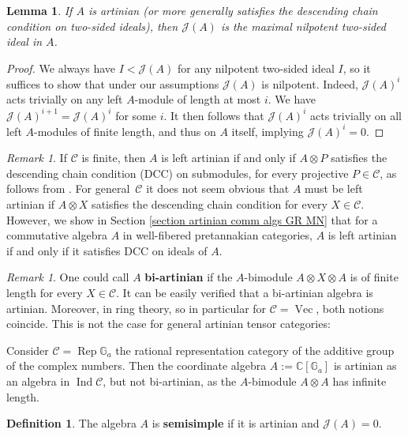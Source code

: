 \documentclass[11pt]{amsart}
\def\Ind{\operatorname{Ind}}
\def\JJ{\mathcal{J}}
\def\cC{\mathscr{C}}
\def\Rep{\operatorname{Rep}}
\def\Vec{\operatorname{Vec}}
\newtheorem{lemma}[thm]{Lemma}
\theoremstyle{definition}
\newtheorem{definition}[thm]{Definition}
\theoremstyle{remark}
\newtheorem{remark}[thm]{Remark}
\numberwithin{equation}{section}
\newcommand{\mC}{\mathbb{C}}
\newcommand{\mG}{\mathbb{G}}
\begin{document}
\begin{lemma}\label{lem:Jart}
    If $A$ is artinian (or more generally satisfies the descending chain condition on two-sided ideals), then $\JJ(A)$ is the maximal nilpotent two-sided ideal in $A$.
\end{lemma}
\begin{proof}
    We always have $I<\JJ(A)$ for any nilpotent two-sided ideal $I$, so
    it suffices to show that under our assumptions  $\JJ(A)$ is nilpotent. Indeed, $\JJ(A)^i$ acts trivially on any left $A$-module of length at most $i$. We have $\JJ(A)^{i+1}=\JJ(A)^{i}$ for some $i$. It then follows that $\JJ(A)^i$ acts trivially on all left $A$-modules of finite length, and thus on $A$ itself, implying $\JJ(A)^i=0$. 
\end{proof}

\begin{remark}
    If $\cC$ is finite, then $A$ is left artinian if and only if $A\otimes P$ satisfies the descending chain condition (DCC) on submodules, for every projective $P\in\cC$, as follows from \cite{N}. For general~$\cC$ it does not seem obvious that $A$ must be left artinian if $A\otimes X$ satisfies the descending chain condition for every $X\in\cC$.  However, we show in Section \ref{section artinian comm algs GR MN} that for a commutative algebra $A$ in well-fibered pretannakian categories, $A$ is left artinian if and only if it satisfies DCC on ideals of $A$.
\end{remark}

\begin{remark}
    One could call $A$ {\bf bi-artinian}
    if the $A$-bimodule $A\otimes X\otimes A$ is of finite length for every $X\in\cC$. It can be easily verified that a bi-artinian algebra is artinian. Moreover, in ring theory, so in particular for $\cC=\Vec$, both notions coincide. This is not the case for general artinian tensor categories:


    Consider $\cC=\Rep\mG_a$ the rational representation category of the additive group of the complex numbers. Then the coordinate algebra $A:=\mC[\mG_a]$ is artinian as an algebra in $\Ind\cC$, but not bi-artinian, as the $A$-bimodule $A\otimes A$ has infinite length.
\end{remark}




\begin{definition}
    The algebra $A$ is {\bf semisimple} if it is artinian and $\JJ(A)=0$.
\end{definition}
\end{document}
